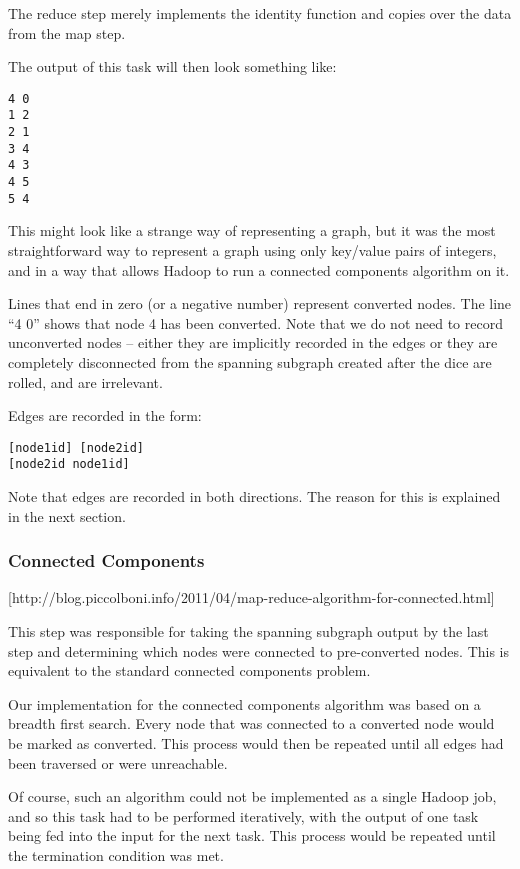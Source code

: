 The reduce step merely implements the identity function and copies over the data from the map step.

The output of this task will then look something like:

\begin{verbatim}
4 0
1 2
2 1
3 4
4 3
4 5
5 4
\end{verbatim}

This might look like a strange way of representing a graph, but it was the most straightforward way to represent a graph using only key/value pairs of integers, and in a way that allows Hadoop to run a connected components algorithm on it.

Lines that end in zero (or a negative number) represent converted nodes. The line ``4 0'' shows that node 4 has been converted. Note that we do not need to record unconverted nodes -- either they are implicitly recorded in the edges or they are completely disconnected from the spanning subgraph created after the dice are rolled, and are irrelevant.

Edges are recorded in the form:

\begin{verbatim}
[node1id] [node2id]
[node2id node1id]
\end{verbatim}

Note that edges are recorded in both directions. The reason for this is explained in the next section.

\subsubsection{Connected Components}
[http://blog.piccolboni.info/2011/04/map-reduce-algorithm-for-connected.html]

This step was responsible for taking the spanning subgraph output by the last step and determining which nodes were connected to pre-converted nodes. This is equivalent to the standard connected components problem.

Our implementation for the connected components algorithm was based on a breadth first search. Every node that was connected to a converted node would be marked as converted. This process would then be repeated until all edges had been traversed or were unreachable.

Of course, such an algorithm could not be implemented as a single Hadoop job, and so this task had to be performed iteratively, with the output of one task being fed into the input for the next task. This process would be repeated until the termination condition was met.

